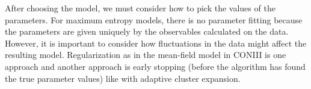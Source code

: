 \documentclass[aps,prl,twocolumn]{revtex4-1}
\begin{document}
After choosing the model, we must consider how to pick the values of the parameters. For maximum entropy models, there is no parameter fitting because the parameters are given uniquely by the observables calculated on the data. However, it is important to consider how fluctuations in the data might affect the resulting model. Regularization as in the mean-field model in CONIII is one approach and another approach is early stopping (before the algorithm has found the true parameter values) like with adaptive cluster expansion.

%
%


\end{document}
